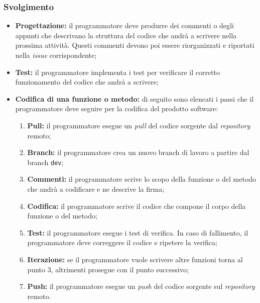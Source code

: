 \subsubsection{Svolgimento}
\begin{itemize}
	\item \textbf{Progettazione:} il programmatore deve produrre dei commenti o
	      degli appunti che descrivano la struttura del codice che andrà a
	      scrivere nella prossima attività. Questi commenti devono poi essere
	      riorganizzati e riportati nella \textit{issue\g} corrispondente;

	\item \textbf{Test:} il programmatore implementa i test per verificare
	      il corretto funzionamento del codice che andrà a scrivere;

	\item \textbf{Codifica di una funzione o metodo:} di seguito sono elencati i
	      passi che il programmatore deve seguire per la codifica del prodotto
	      software:
	      \begin{enumerate}
		      \item \textbf{Pull:} il programmatore esegue un \textit{pull} del
		            codice sorgente dal \textit{repository\g} remoto;

		      \item \textbf{Branch:} il programmatore crea un nuovo branch di
		            lavoro a partire dal branch \texttt{dev};

		      \item \textbf{Commenti:} il programmatore scrive lo scopo della
		            funzione o del metodo che andrà a codificare e ne descrive
		            la firma;

		      \item \textbf{Codifica:} il programmatore scrive il codice che
		            compone il corpo della funzione o del metodo;

		      \item \textbf{Test:} il programmatore esegue i test di verifica.
		            In caso di fallimento, il programmatore deve correggere il
		            codice e ripetere la verifica;

		      \item \textbf{Iterazione:} se il programmatore vuole scrivere
		            altre funzioni torna al punto 3, altrimenti prosegue
		            con il punto successivo;

		      \item \textbf{Push:} il programmatore esegue un \textit{push}
		            del codice sorgente sul \textit{repository\g} remoto.


\end{enumerate}
\end{itemize}
